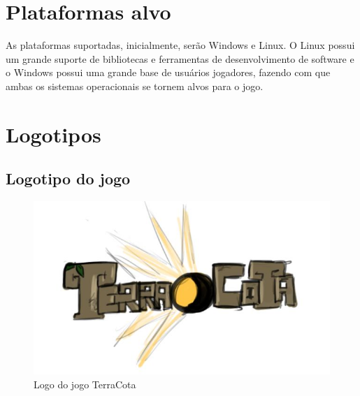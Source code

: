 \documentclass[11pt]{article}
\begin{document}
\section{Plataformas alvo}
As plataformas suportadas, inicialmente, serão Windows e Linux.
O Linux possui um grande suporte de bibliotecas e ferramentas de desenvolvimento de software e o Windows possui uma grande base de usuários jogadores, fazendo com que ambas os sistemas operacionais se tornem alvos para o jogo.

\section{Logotipos}
\subsection{Logotipo do jogo}
\begin{figure}[!htp]
\centering
\includegraphics[scale=0.75]{logo-terracota.jpg}
\caption{Logo do jogo TerraCota}
\label{TerraCota logo}
\end{figure}
\end{document}
